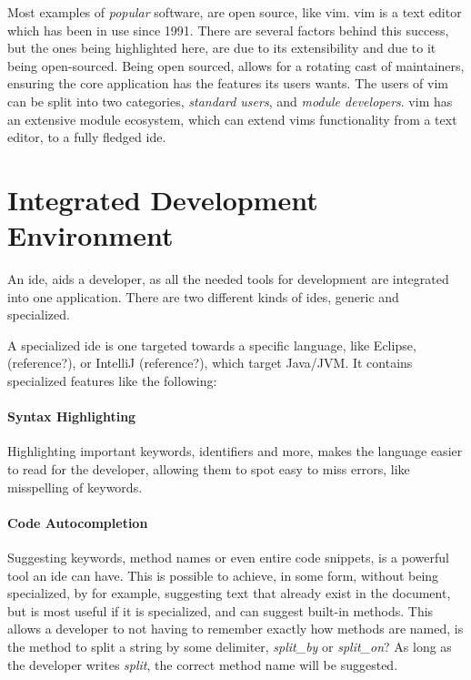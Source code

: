 Most examples of \textit{popular} software, are open source, like \gls{vim}.
\gls{vim} is a text editor which has been in use since 1991. There are several
factors behind this success, but the ones being highlighted here, are due to its
extensibility and due to it being open-sourced. Being open sourced, allows for a
rotating cast of maintainers, ensuring the core application has the features its
users wants. The users of \gls{vim} can be split into two categories,
\textit{standard users}, and \textit{module developers}. \gls{vim} has an
extensive module ecosystem, which can extend \gls{vim}s functionality from a
text editor, to a fully fledged \gls{ide}.

\section{Integrated Development Environment} \label{sec:ide}

An \gls{ide}, aids a developer, as all the needed tools for development are
integrated into one application. There are two different kinds of \gls{ide}s,
generic and specialized. 

A specialized \gls{ide} is one targeted towards a specific language, like
Eclipse, (reference?), or IntelliJ (reference?), which target Java/JVM. It
contains specialized features like the following:

\paragraph{Syntax Highlighting} Highlighting important keywords, identifiers
and more, makes the language easier to read for the developer, allowing them to
spot easy to miss errors, like misspelling of keywords.

\paragraph{Code Autocompletion} Suggesting keywords, method names or even entire
code snippets, is a powerful tool an \gls{ide} can have. This is possible to
achieve, in some form, without being specialized, by for example, suggesting
text that already exist in the document, but is most useful if it is
specialized, and can suggest built-in methods. This allows a developer to not
having to remember exactly how methods are named, is the method to split a
string by some delimiter, \textit{split\_by} or \textit{split\_on}? As long as
the developer writes \textit{split}, the correct method name will be suggested.


